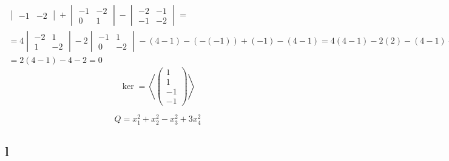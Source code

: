 \begin{itemize}
\begin{multline*}
\begin{vmatrix}
            -1 & -2
        \end{vmatrix} +
        \begin{vmatrix}
        	-1 & -2 \\
            0 & 1
        \end{vmatrix} -
        \begin{vmatrix}
        	-2 & -1 \\
            -1 & -2
        \end{vmatrix} = \\
        = 4
        \begin{vmatrix}
        	-2 & 1 \\
            1 & -2
        \end{vmatrix} - 2
        \begin{vmatrix}
        	-1 & 1 \\
            0 & -2
        \end{vmatrix} - (4 - 1) - (-(-1)) + (-1) - (4 - 1) = 4(4 - 1) - 2(2) - (4 - 1) - 1 - 1 - (4 - 1) = \\
        = 2(4 - 1) - 4 - 2 = 0
    \end{multline*}
    $$ \ker = \left\langle
    \begin{pmatrix}
    	1 \\
        1 \\
        -1 \\
        -1
    \end{pmatrix} \right\rangle $$
\end{itemize}
$$ Q = x_1^2 + x_2^2 - x_3^2 + 3x_4^2 $$

\subsection{l}

